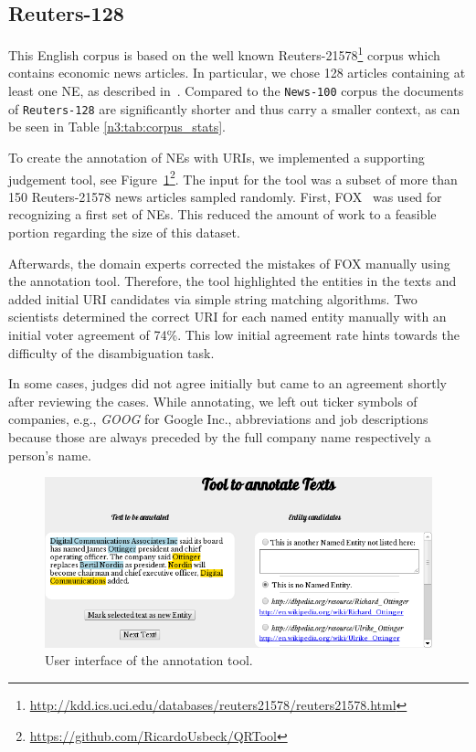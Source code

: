 \subsection{Reuters-128}

This English corpus is based on the well known Reuters-21578\footnote{\url{http://kdd.ics.uci.edu/databases/reuters21578/reuters21578.html}} corpus which contains economic news articles.
In particular, we chose 128 articles containing at least one NE, as described in~\cite{agdistis_iswc}.
Compared to the \texttt{News-100} corpus the documents of \texttt{Reuters-128} are significantly shorter and thus carry a smaller context, as can be seen in Table \ref{n3:tab:corpus_stats}.

To create the annotation of NEs with URIs, we implemented a supporting judgement tool, see Figure~\ref{n3:fig:qrtool}\footnote{\url{https://github.com/RicardoUsbeck/QRTool}}. 
The input for the tool was a subset of more than 150 Reuters-21578 news articles sampled randomly.
First, FOX~\cite{FOX} was used for recognizing a first set of NEs. 
This reduced the amount of work to a feasible portion regarding the size of this dataset.

Afterwards, the domain experts corrected the  mistakes of FOX manually using the annotation tool.
Therefore, the tool highlighted the entities in the texts and added initial URI candidates via simple string matching algorithms.
Two scientists determined the correct URI for each named entity manually with an initial voter agreement of 74\%.
This low initial agreement rate hints towards the difficulty of the disambiguation task.

In some cases, judges did not agree initially but came to an agreement shortly after reviewing the cases.
While annotating, we left out ticker symbols of companies, e.g., \textit{GOOG} for Google Inc., abbreviations and job descriptions because those are always preceded by the full company name respectively a person's name.

\begin{figure}[htb!]
\centering
\includegraphics[width=\linewidth]{part_02/benchmarking/LREC_N3NIFNERNED/qrtool.png}
\caption{User interface of the annotation tool.}
\label{n3:fig:qrtool}
\end{figure}


